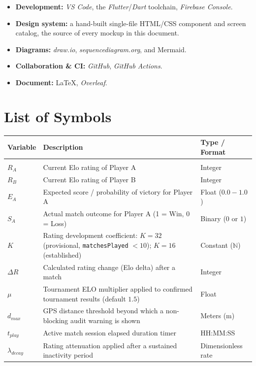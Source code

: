 \documentclass{configurations/polimi3i_thesis}
\renewcommand{\_}{\textunderscore\allowbreak}
\let\cleardoublepage\clearpage
\begin{document}
\begin{itemize}
    \item \textbf{Development:} \textit{VS Code}, the \textit{Flutter}/\textit{Dart} toolchain, \textit{Firebase Console}.
    \item \textbf{Design system:} a hand-built single-file HTML/CSS component and screen catalog, the source of every mockup in this document.
    \item \textbf{Diagrams:} \textit{draw.io}, \textit{sequencediagram.org}, and Mermaid.
    \item \textbf{Collaboration \& CI:} \textit{GitHub}, \textit{GitHub Actions}.
    \item \textbf{Document:} \LaTeX{}, \textit{Overleaf}.
\end{itemize}

\listoffigures

\listoftables

\chapter*{List of Symbols}

\begin{table}[H]
    \centering
    \small
    \begin{tabularx}{\textwidth}{l X l}
        \textbf{Variable} & \textbf{Description} & \textbf{Type / Format} \\\hline\\[-9px]
        $R_A$             & Current Elo rating of Player A & Integer \\[2px]
        $R_B$             & Current Elo rating of Player B & Integer \\[2px]
        $E_A$             & Expected score / probability of victory for Player A & Float ($0.0-1.0$) \\[2px]
        $S_A$             & Actual match outcome for Player A (1 = Win, 0 = Loss) & Binary ($0$ or $1$) \\[2px]
        $K$               & Rating development coefficient: $K=32$ (provisional, \texttt{matchesPlayed} $< 10$); $K=16$ (established) & Constant ($\mathbb{N}$) \\[2px]
        $\Delta R$        & Calculated rating change (Elo delta) after a match & Integer \\[2px]
        $\mu$             & Tournament ELO multiplier applied to confirmed tournament results (default $1.5$) & Float \\[2px]
        $d_{max}$         & GPS distance threshold beyond which a non-blocking audit warning is shown & Meters (m) \\[2px]
        $t_{play}$        & Active match session elapsed duration timer & HH:MM:SS \\[2px]
        $\lambda_{decay}$ & Rating attenuation applied after a sustained inactivity period & Dimensionless rate \\[2px]
    \end{tabularx}
\end{table}

\cleardoublepage
\end{document}
